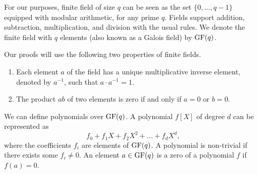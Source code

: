 
 \label{app:finite-fields}

For our purposes, finite field of size $q$ can be seen as the set $\{0,\dots,q-1\}$ equipped with modular arithmetic, for any prime $q$. Fields support addition, subtraction, multiplication, and division with the usual rules. We denote the finite field with $q$ elements (also known as a Galois field) by $\operatorname{GF}(q)$.

Our proofs will use the following two properties of finite fields.
\begin{enumerate}
  \item Each element $a$ of the field has a unique multiplicative inverse element, denoted by $a^{-1}$, such that $a\cdot a^{-1} = 1$.
  \item The product $ab$ of two elements is zero if and only if $a = 0$ or $b = 0$.
\end{enumerate}

We can define polynomials over $\operatorname{GF}(q)$. A polynomial $f[X]$ of degree $d$ can be represented as
\[
  f_0 + f_1 X + f_2 X^2 + \dots + f_d X^d,
\]
where the coefficients $f_i$ are elements of $\operatorname{GF}(q)$. A polynomial is non-trivial if there exists some $f_i \neq 0$. An element $a \in \operatorname{GF}(q)$ is a zero of a polynomial $f$ if $f(a) = 0$.

